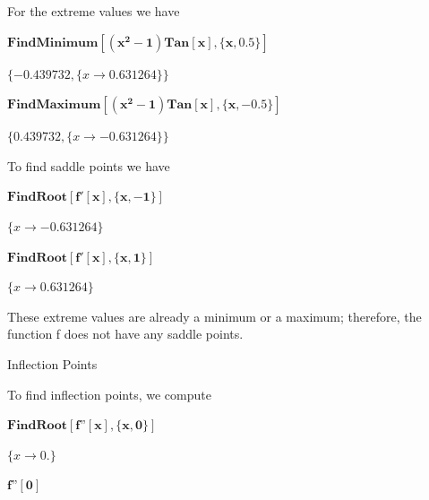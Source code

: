\documentclass{article}
\begin{document}
For the extreme values we have

\begin{doublespace}
\noindent\(\pmb{\text{FindMinimum}\left[\left(x^2-1\right)\text{Tan}[x],\{x,0.5\}\right]}\)
\end{doublespace}

\begin{doublespace}
\noindent\(\{-0.439732,\{x\to 0.631264\}\}\)
\end{doublespace}

\begin{doublespace}
\noindent\(\pmb{\text{FindMaximum}\left[\left(x^2-1\right)\text{Tan}[x],\{x,-0.5\}\right]}\)
\end{doublespace}

\begin{doublespace}
\noindent\(\{0.439732,\{x\to -0.631264\}\}\)
\end{doublespace}

To find saddle points we have

\begin{doublespace}
\noindent\(\pmb{\text{FindRoot}[f'[x],\{x,-1\}]}\)
\end{doublespace}

\begin{doublespace}
\noindent\(\{x\to -0.631264\}\)
\end{doublespace}

\begin{doublespace}
\noindent\(\pmb{\text{FindRoot}[f'[x],\{x,1\}]}\)
\end{doublespace}

\begin{doublespace}
\noindent\(\{x\to 0.631264\}\)
\end{doublespace}

These extreme values are already a minimum or a maximum; therefore, the function f does not have any saddle points.

Inflection Points

To find inflection points, we compute

\begin{doublespace}
\noindent\(\pmb{\text{FindRoot}[f\text{''}[x],\{x,0\}]}\)
\end{doublespace}

\begin{doublespace}
\noindent\(\{x\to 0.\}\)
\end{doublespace}

\begin{doublespace}
\noindent\(\pmb{f\text{''}[0]}\)
\end{doublespace}
\end{document}
